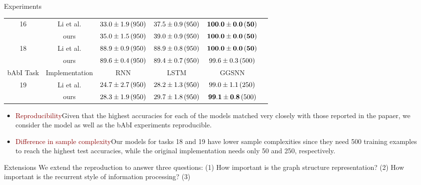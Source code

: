 \documentclass[final,hyperref={pdfpagelabels=false}]{beamer}
\begin{document}
\begin{frame}[t]
\begin{columns}[t]
\begin{column}{.3\textwidth}
\begin{block}{Experiments}
\begin{table}[t]
\begin{tabular}{cccccc}
              \multirow{2}{*}{16} & Li et al. &  $33.0 \pm 1.9\thinspace (950)$&  $37.5 \pm 0.9\thinspace (950)$ & $\mathbf{100.0 \pm 0.0\thinspace (50)}$  \\
              & ours & $35.0 \pm 1.5\thinspace (950)$ & $39.0 \pm 0.9\thinspace (950)$ & $\mathbf{100.0 \pm 0.0\thinspace (50)}$ \\  \midrule
        
              \multirow{2}{*}{18} & Li et al. & $88.9 \pm 0.9\thinspace (950)$ & $88.9 \pm 0.8\thinspace (950)$ & $\mathbf{100.0 \pm 0.0\thinspace (50)}$ \\
              & ours & $89.6 \pm 0.4\thinspace (950)$ & $89.4 \pm 0.7\thinspace (950)$ & $99.6\pm 0.3\thinspace (500)$\\ \midrule
              
              bAbI Task & Implementation & RNN & LSTM & GGSNN \\  \midrule
              
              \multirow{2}{*}{19} & Li et al. & $24.7 \pm 2.7\thinspace (950)$ & $28.2 \pm 1.3\thinspace (950)$ & $99.0\pm1.1\thinspace (250)$\\ 
              & ours & $28.3 \pm 1.9\thinspace (950)$ & $29.7 \pm 1.8\thinspace (950)$ & $\mathbf{99.1\pm 0.8}\thinspace (500)$\\ \bottomrule
        \end{tabular}
        \end{table}
        \vspace{0.2in}
        
    \begin{itemize}
        \item \textcolor{darkred}{Reproducibility}\thinspace Given that the highest accuracies for each of the models matched very closely with those reported in the papaer, we consider the model as well as the bAbI experiments reproducible.
        \item \textcolor{darkred}{Difference in sample complexity}\thinspace Our models for tasks 18 and 19 have lower sample complexities since they need 500 training examples to reach the highest test accuracies, while the original implementation needs only 50 and 250, respectively.
    \end{itemize}
    \end{block}
    
    \begin{block}{Extensions}
    We extend the reproduction to answer three questions: (1) How important is the graph structure representation? (2) How important is the recurrent style of information processing? (3)
    \end{block}
    

\end{column}
\end{columns}
\end{frame}
\end{document}
